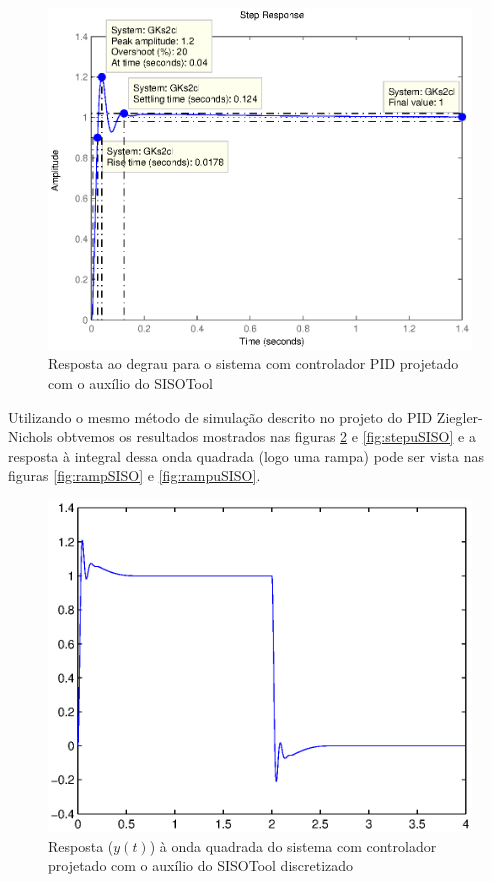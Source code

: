 \documentclass{article}
\begin{document}
	\begin{figure}[H]
		\centering
		\includegraphics[width=\linewidth]{stepgks2cl}
		\caption{Resposta ao degrau para o sistema com controlador PID projetado com o auxílio do SISOTool}
		\label{fig:stepgks2cl}
	\end{figure}
Utilizando o mesmo método de simulação descrito no projeto do PID Ziegler-Nichols  obtvemos os resultados mostrados nas figuras \ref{fig:stepSISO} e \ref{fig:stepuSISO} e a resposta à integral dessa onda quadrada (logo uma rampa) pode ser vista nas figuras \ref{fig:rampSISO} e \ref{fig:rampuSISO}.  
\begin{figure}[H]
	\centering
	\includegraphics[width=0.8\linewidth]{stepSISO}
	\caption{Resposta ($y(t)$) à onda quadrada do sistema com controlador projetado com o auxílio do SISOTool discretizado}
	\label{fig:stepSISO}
\end{figure}
\end{document}
